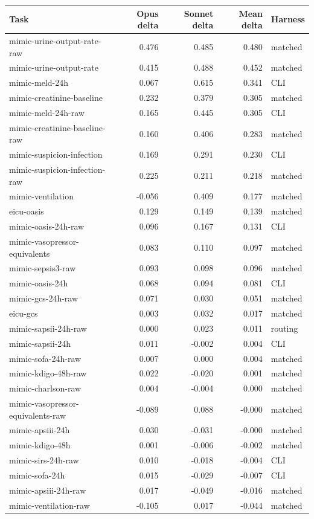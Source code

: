 \begin{tabular}{lrrrl}
\toprule
Task & Opus delta & Sonnet delta & Mean delta & Harness \\
\midrule
mimic-urine-output-rate-raw & 0.476 & 0.485 & 0.480 & matched \\
mimic-urine-output-rate & 0.415 & 0.488 & 0.452 & matched \\
mimic-meld-24h & 0.067 & 0.615 & 0.341 & CLI \\
mimic-creatinine-baseline & 0.232 & 0.379 & 0.305 & matched \\
mimic-meld-24h-raw & 0.165 & 0.445 & 0.305 & CLI \\
mimic-creatinine-baseline-raw & 0.160 & 0.406 & 0.283 & matched \\
mimic-suspicion-infection & 0.169 & 0.291 & 0.230 & CLI \\
mimic-suspicion-infection-raw & 0.225 & 0.211 & 0.218 & matched \\
mimic-ventilation & -0.056 & 0.409 & 0.177 & matched \\
eicu-oasis & 0.129 & 0.149 & 0.139 & matched \\
mimic-oasis-24h-raw & 0.096 & 0.167 & 0.131 & CLI \\
mimic-vasopressor-equivalents & 0.083 & 0.110 & 0.097 & matched \\
mimic-sepsis3-raw & 0.093 & 0.098 & 0.096 & matched \\
mimic-oasis-24h & 0.068 & 0.094 & 0.081 & CLI \\
mimic-gcs-24h-raw & 0.071 & 0.030 & 0.051 & matched \\
eicu-gcs & 0.003 & 0.032 & 0.017 & matched \\
mimic-sapsii-24h-raw & 0.000 & 0.023 & 0.011 & routing \\
mimic-sapsii-24h & 0.011 & -0.002 & 0.004 & CLI \\
mimic-sofa-24h-raw & 0.007 & 0.000 & 0.004 & matched \\
mimic-kdigo-48h-raw & 0.022 & -0.020 & 0.001 & matched \\
mimic-charlson-raw & 0.004 & -0.004 & 0.000 & matched \\
mimic-vasopressor-equivalents-raw & -0.089 & 0.088 & -0.000 & matched \\
mimic-apsiii-24h & 0.030 & -0.031 & -0.000 & matched \\
mimic-kdigo-48h & 0.001 & -0.006 & -0.002 & matched \\
mimic-sirs-24h-raw & 0.010 & -0.018 & -0.004 & CLI \\
mimic-sofa-24h & 0.015 & -0.029 & -0.007 & CLI \\
mimic-apsiii-24h-raw & 0.017 & -0.049 & -0.016 & matched \\
mimic-ventilation-raw & -0.105 & 0.017 & -0.044 & matched \\
\bottomrule
\end{tabular}
